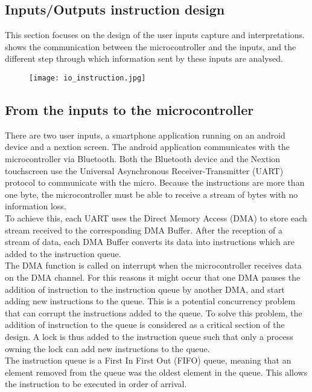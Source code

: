 \subsection{Inputs/Outputs instruction design}
This section focuses on the design of the user inputs capture and interpretations.  shows the communication between the microcontroller and the inputs, and the different step through which information sent by these inputs are analysed. 
\begin{figure}[ht]
\centering
\texttt{[image: io\_instruction.jpg]}
\caption{}
\label{fig:io_instruction}
\end{figure}

\subsection{From the inputs to the microcontroller}
There are two user inputs, a smartphone application running on an android device and a nextion screen. The android application communicates with the microcontroller via Bluetooth. Both the Bluetooth device and the Nextion touchscreen use the Universal Asynchronous Receiver-Transmitter (UART) protocol to communicate with the micro. Because the instructions are more than one byte, the microcontroller must be able to receive a stream of bytes with no information loss.\\
To achieve this, each UART uses the Direct Memory Access (DMA) to store each stream received to the corresponding DMA Buffer. After the reception of a stream of data, each DMA Buffer converts its data into instructions which are added to the instruction queue.\\
The DMA function is called on interrupt when the microcontroller receives data on the DMA channel. For this reasons it might occur that one DMA pauses the addition of instruction to the instruction queue by another DMA, and start adding new instructions to the queue. This is a potential concurrency problem that can corrupt the instructions added to the queue. To solve this problem, the addition of instruction to the queue is considered as a critical section of the design. A lock is thus added to the instruction queue such that only a process owning the lock can add new instructions to the queue.\\
The instruction queue is a First In First Out (FIFO) queue, meaning that an element removed from the queue was the oldest element in the queue. This allows the instruction to be executed in order of arrival.

